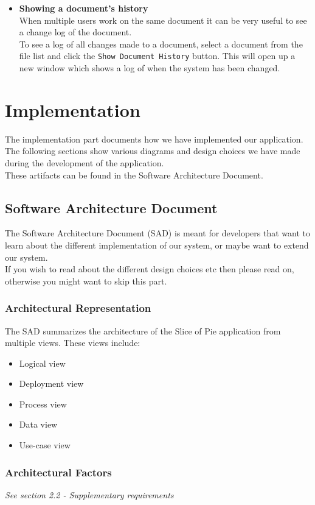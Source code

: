 \documentclass[11pt]{article}
\begin{document}
\begin{itemize}
\item \textbf{Showing a document's history} \\
\label{sec-3-4-2-5}%
When multiple users work on the same document it can be very useful to see a change log of the document. \\
To see a log of all changes made to a document, select a document from the file list and click the \texttt{Show Document History} button. This will open up a new window which shows a log of when the system has been changed.
\newpage
\end{itemize} %
\section{Implementation}
\label{sec-4}
The implementation part documents how we have implemented our application. \\
The following sections show various diagrams and design choices we have made during the development of the application. \\
These artifacts can be found in the Software Architecture Document.
\subsection{Software Architecture Document}
\label{sec-4-1}
The Software Architecture Document (SAD) is meant for developers that want to learn about the different implementation of our system, or maybe want to extend our system. \\
If you wish to read about the different design choices etc then please read on, otherwise you might want to skip this part.
\subsubsection{Architectural Representation}
\label{sec-4-1-1}

The SAD summarizes the architecture of the Slice of Pie application from multiple views. These views include:
\begin{itemize}
\item Logical view
\item Deployment view
\item Process view
\item Data view
\item Use-case view
\end{itemize}
\subsubsection{Architectural Factors}
\label{sec-4-1-2}
\emph{See section 2.2 - Supplementary requirements}
\end{document}

